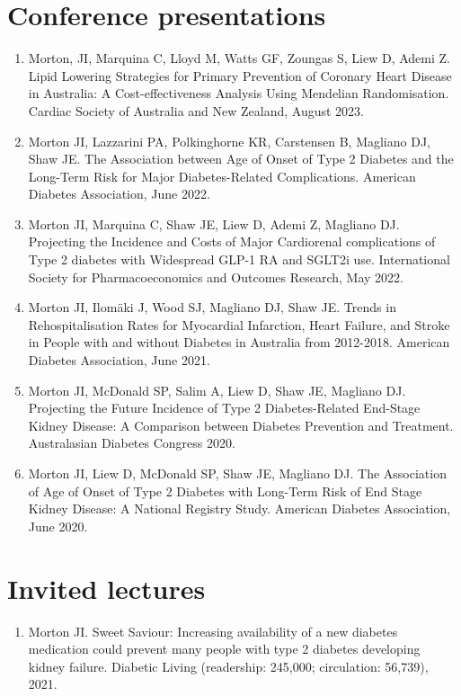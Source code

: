 \documentclass[11pt]{article}
\begin{document}
\section*{Conference presentations}
\begin{enumerate}
\item Morton, JI, Marquina C, Lloyd M, Watts GF, Zoungas S, Liew D, Ademi Z. 
Lipid Lowering Strategies for Primary Prevention of Coronary Heart Disease in Australia: 
A Cost-effectiveness Analysis Using Mendelian Randomisation. 
Cardiac Society of Australia and New Zealand, August 2023.
\item Morton JI, Lazzarini PA, Polkinghorne KR, Carstensen B, Magliano DJ, Shaw JE. 
The Association between Age of Onset of Type 2 Diabetes and the Long-Term Risk for Major Diabetes-Related Complications. 
American Diabetes Association, June 2022. 
\item Morton JI, Marquina C, Shaw JE, Liew D, Ademi Z, Magliano DJ. 
Projecting the Incidence and Costs of Major Cardiorenal complications of 
Type 2 diabetes with Widespread GLP-1 RA and SGLT2i use. 
International Society for Pharmacoeconomics and Outcomes Research, May 2022.
\item Morton JI, Ilom{\"a}ki J, Wood SJ, Magliano DJ, Shaw JE. 
Trends in Rehospitalisation Rates for Myocardial Infarction, Heart Failure, and Stroke in People with
and without Diabetes in Australia from 2012-2018. American Diabetes Association, June 2021.
\item Morton JI, McDonald SP, Salim A, Liew D, Shaw JE, Magliano DJ. 
Projecting the Future Incidence of Type 2 Diabetes-Related End-Stage Kidney Disease: 
A Comparison between Diabetes Prevention and Treatment. Australasian Diabetes Congress 2020.
\item Morton JI, Liew D, McDonald SP, Shaw JE, Magliano DJ. 
The Association of Age of Onset of Type 2 Diabetes with Long-Term Risk of End Stage Kidney Disease: 
A National Registry Study. American Diabetes Association, June 2020.  
\end{enumerate}

\section*{Invited lectures}
\begin{enumerate}
\item Morton JI. Sweet Saviour: Increasing availability of a new diabetes medication could prevent many people with 
type 2 diabetes developing kidney failure. Diabetic Living (readership: 245,000; circulation: 56,739), 2021. 
\end{enumerate}
\end{document}
